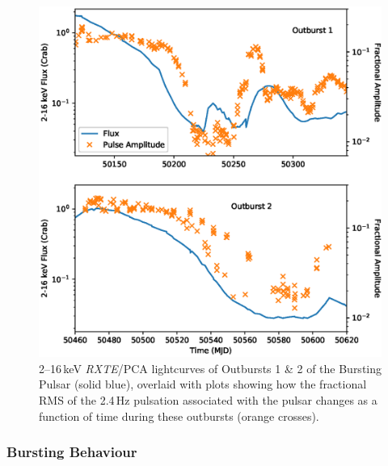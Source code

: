 \begin{figure}
  \centering
  \includegraphics[width=.9\linewidth, trim={0.4cm 1cm 0cm 1cm},clip]{images/PulseAmp.eps}
  \caption[\textit{RXTE}/PCA lightcurves of Outbursts 1 \& 2 of the Bursting Pulsar, overlaid with plots showing how the fractional RMS of the 2.4\,Hz pulsation changes as a function of time.]{\small 2--16\,keV \indexpca\textit{RXTE}/PCA lightcurves of Outbursts 1 \& 2 of the Bursting Pulsar (solid blue), overlaid with plots showing how the fractional RMS of the 2.4\,Hz pulsation associated with the pulsar changes as a function of time during these outbursts (orange crosses).}
  \label{fig:pulsovertime}
\end{figure}

\subsubsection{Bursting Behaviour}

\label{sec:bburstevo}

